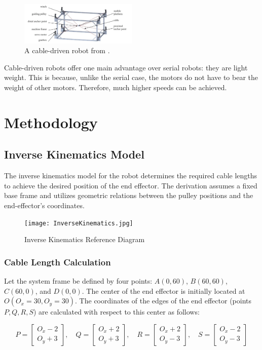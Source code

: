 \documentclass[11pt]{article}
\begin{document}
\begin{figure}[h]
\centering
\includegraphics[width=0.5\textwidth]{Cabledrivenrobot.png}
\caption{A cable-driven robot from \cite{pott2018cable}.}
\label{fig:figure6}
\end{figure}

Cable-driven robots offer one main advantage over serial robots: they are light weight. This is because, unlike the serial case, the
motors do not have to bear the weight of other motors. Therefore, much higher speeds can be achieved. 

\section{Methodology}
\subsection{Inverse Kinematics Model}
The inverse kinematics model for the robot determines the required cable lengths to achieve the desired position of the end effector. The derivation assumes a fixed base frame and utilizes geometric relations between the pulley positions and the end-effector's coordinates.
\begin{figure}[h]
\centering
\texttt{[image: InverseKinematics.jpg]}
\caption{Inverse Kinematics Reference Diagram}
\label{fig:robot}
\end{figure}
\subsubsection*{Cable Length Calculation}

Let the system frame be defined by four points: \( A (0, 60) \), \( B (60, 60) \), \( C (60, 0) \), and \( D (0, 0) \). The center of the end effector is initially located at \( O(O_x = 30, O_y = 30) \). The coordinates of the edges of the end effector (points \( P, Q, R, S \)) are calculated with respect to this center as follows:

\[
P = \begin{bmatrix}
O_x - 2\\
O_y + 3
\end{bmatrix}, \quad
Q = \begin{bmatrix}
O_x + 2\\
O_y + 3
\end{bmatrix}, \quad
R = \begin{bmatrix}
O_x + 2\\
O_y - 3
\end{bmatrix}, \quad
S = \begin{bmatrix}
O_x - 2\\
O_y - 3
\end{bmatrix}
\]
\end{document}
